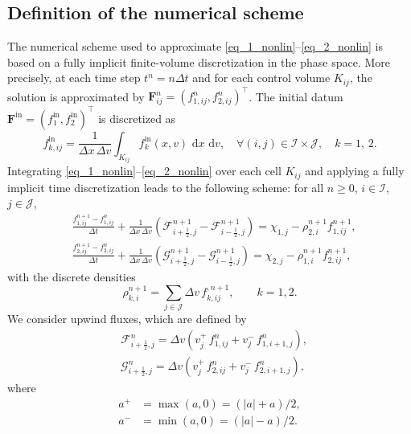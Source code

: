 \documentclass[reqno]{amsart}
\newcommand{\Dt}{\Delta t}
\newcommand{\Dx}{\Delta x}
\newcommand{\Dv}{\Delta v}
\newcommand{\dd}{\,\mathrm{d}}
\newcommand{\II}{\mathcal{I}}
\newcommand{\J}{\mathcal{J}}
\newcommand{\Fbf}{\mathbf{F}}
\newcommand{\iph}{{i+\frac{1}{2}}}
\newcommand{\imh}{{i-\frac{1}{2}}}
\newcommand{\tin}{{\mathrm{in}}}
\numberwithin{equation}{section}
\begin{document}
\subsection{Definition of the numerical scheme}
The numerical scheme used to approximate \eqref{eq_1_nonlin}–\eqref{eq_2_nonlin} is based on a fully implicit finite-volume discretization in the phase space. More precisely, at each time step $t^n = n\Dt$ and for each control volume $K_{ij}$, the solution is approximated by $\Fbf^n_{ij}=(f^n_{1,ij},f^n_{2,ij})^\top$. The initial datum $\Fbf^\tin=(f_{1}^\tin,f_{2}^\tin)^\top$ is discretized as
\[
f_{k,ij}^\tin=\frac{1}{\Dx\,\Dv}\int_{K_{ij}}f_k^\tin(x,v)\,\dd x\,\dd v, \quad \forall (i,j)\in\II\times\J,\quad k =1,\,2.
\]
Integrating \eqref{eq_1_nonlin}--\eqref{eq_2_nonlin} over each cell $K_{ij}$ and applying a fully implicit time discretization leads to the following scheme: for all $n\geq 0$, $i\in\II$, $j\in\J$,
\begin{align}
    & \frac{f_{1,ij}^{n+1}-f_{1,ij}^n}{\Delta t}+\frac{1}{\Dx\,\Dv}\left(\mathcal{F}_{\iph,j}^{n+1}-\mathcal{F}_{\imh,j}^{n+1}\right)=\chi_{1,j}-\rho_{2,i}^{n+1}f_{1,ij}^{n+1} ,\label{scheme_1_nonlin_d1}\\
    &  \frac{f_{2,ij}^{n+1}-f_{2,ij}^n}{\Delta t}+\frac{1}{\Dx\,\Dv}\left(\mathcal{G}_{\iph,j}^{n+1}-\mathcal{G}_{\imh,j}^{n+1}\right)=\chi_{2,j}-\rho_{1,i}^{n+1}f_{2,ij}^{n+1},\label{scheme_2_nonlin_d1}
\end{align}
with the discrete densities
\begin{equation}\label{def_density_dis}
\rho_{k,i}^{n+1} = \sum_{j \in \J}\Delta v\, f_{k,ij}^{,n+1} , \qquad k=1,2.
\end{equation}
We consider upwind fluxes, which are defined by
\begin{align}
    & \mathcal{F}^n_{\iph,j}=\Dv\left(v_j^+ \,f^n_{1,ij} + v_j^- \,f^n_{1,i+1,j}\right),\label{flux_F_UW_sd1}\\
    & \mathcal{G}^n_{\iph,j}=\Dv \left(v_j^+ \,f^n_{2,ij} + v_j^-\,f^n_{2,i+1,j}\right) \label{flux_G_UW_sd1},
\end{align}
where
\begin{equation*}
    \begin{aligned}
        a^+ &= \max (a,0)=(|a|+a)/2,\\
        a^- &= \min (a,0)=(|a|-a)/2.
    \end{aligned}
\end{equation*} 
\end{document}
